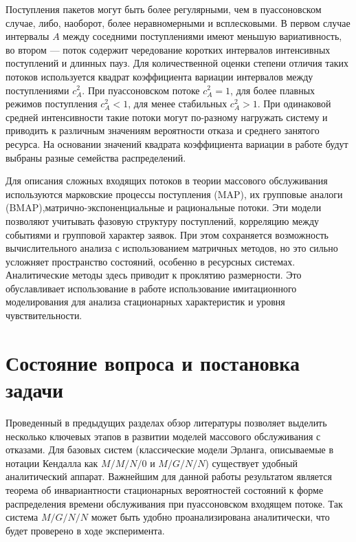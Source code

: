 Поступления пакетов могут быть более регулярными, чем в пуассоновском случае, либо, наоборот, более неравномерными и всплесковыми. В первом случае интервалы $A$ между соседними поступлениями имеют меньшую вариативность, во втором — поток содержит чередование коротких интервалов интенсивных поступлений и длинных пауз. Для количественной оценки степени отличия таких потоков используется квадрат коэффициента вариации интервалов между поступлениями $c^2_A$. При пуассоновском потоке $c^2_A = 1$, для более плавных режимов поступления $c^2_A < 1$, для менее стабильных $c^2_A > 1$. При одинаковой средней интенсивности такие потоки могут по-разному нагружать систему и приводить к различным значениям вероятности отказа и среднего занятого ресурса. На основании значений квадрата коэффициента вариации в работе будут выбраны разные семейства распределений. 

Для описания сложных входящих потоков в теории массового обслуживания используются марковские процессы поступления (MAP), их групповые аналоги (BMAP),матрично-экспоненциальные и рациональные потоки. Эти модели позволяют учитывать фазовую структуру поступлений, корреляцию между событиями и групповой характер заявок. При этом сохраняется возможность вычислительного анализа с использованием матричных методов, но это сильно усложняет пространство состояний, особенно в ресурсных системах. Аналитические методы здесь приводит к проклятию размерности. Это обуславливает использование в работе использование имитационного моделирования для анализа стационарных характеристик и уровня чувствительности. 



\section{Состояние вопроса и постановка задачи}
\label{sec:problem_statement}

Проведенный в предыдущих разделах обзор литературы позволяет выделить несколько ключевых этапов в развитии моделей массового обслуживания с отказами. Для базовых систем (классические модели Эрланга, описываемые в нотации Кендалла как $M/M/N/0$ и $M/G/N/N$) существует удобный аналитический аппарат. Важнейшим для данной работы результатом является теорема об инвариантности стационарных вероятностей состояний к форме распределения времени обслуживания при пуассоновском входящем потоке. Так система $M/G/N/N$ может быть удобно проанализирована аналитически, что будет проверено в ходе эксперимента. 

